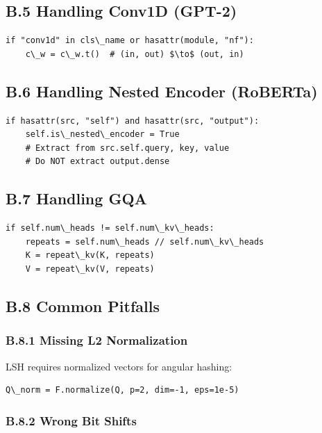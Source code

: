 \subsection{B.5 Handling Conv1D (GPT-2)}

\begin{lstlisting}
if "conv1d" in cls\_name or hasattr(module, "nf"):
    c\_w = c\_w.t()  # (in, out) $\to$ (out, in)
\end{lstlisting}

\subsection{B.6 Handling Nested Encoder (RoBERTa)}

\begin{lstlisting}
if hasattr(src, "self") and hasattr(src, "output"):
    self.is\_nested\_encoder = True
    # Extract from src.self.query, key, value
    # Do NOT extract output.dense
\end{lstlisting}

\subsection{B.7 Handling GQA}

\begin{lstlisting}
if self.num\_heads != self.num\_kv\_heads:
    repeats = self.num\_heads // self.num\_kv\_heads
    K = repeat\_kv(K, repeats)
    V = repeat\_kv(V, repeats)
\end{lstlisting}

\subsection{B.8 Common Pitfalls}

\subsubsection{B.8.1 Missing L2 Normalization}

LSH requires normalized vectors for angular hashing:

\begin{lstlisting}
Q\_norm = F.normalize(Q, p=2, dim=-1, eps=1e-5)
\end{lstlisting}

\subsubsection{B.8.2 Wrong Bit Shifts}

